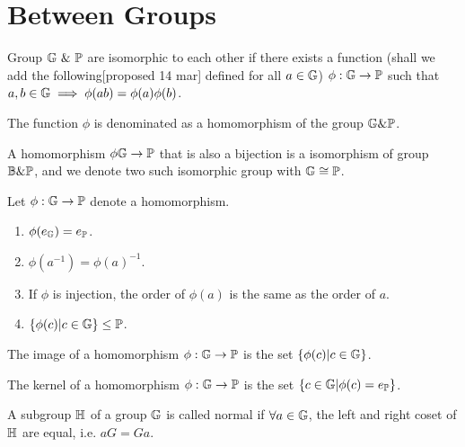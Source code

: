 \documentclass[../note.tex]{subfiles}
\begin{document}
\section{Between Groups}

\begin{definition}[Homomorphism]
	Group $\mathbb{G}\ \& \ \mathbb{P}$ are isomorphic to each other if there exists a function (shall we add the following[proposed 14 mar]  defined for all $a \in \mathbb{G}$)
	$\phi: \mathbb{G}\rightarrow \mathbb{P}$ such that	$ a, b \in \mathbb{G} \implies \phi(ab) = \phi(a)\phi(b)$.

	The function $\phi$ is denominated as a homomorphism of the group $\mathbb{G}\&\mathbb{P}$.
\end{definition}

\begin{definition}[Isomorphism]
	A homomorphism $\phi \mathbb{G} \rightarrow \mathbb{P}$ that is also a bijection is a isomorphism of group $\mathbb{B}\&\mathbb{P}$, and we denote two such isomorphic group with $\mathbb{G} \cong \mathbb{P}$.
\end{definition}

\begin{proposition}
	Let $\phi: \mathbb{G} \rightarrow \mathbb{P}$ denote a homomorphism. 
\begin{enumerate}
	\item $\phi(e_{\mathbb{G}}) = e_{\mathbb{P}}$. 
	\item $\phi(a^{-1}) = \phi(a)^{-1}$.
	\item If $\phi$ is injection, the order of $\phi(a)$ is the same as the order of $a$.
	\item $\{\phi(c) |c \in \mathbb{G}\}\leq \mathbb{P}$.
\end{enumerate}
\end{proposition}

\begin{definition}[Image]
	The image of a homomorphism $\phi: \mathbb{G} \rightarrow \mathbb{P}$ is the set $\{\phi(c) |c \in \mathbb{G}\}$.
\end{definition}
\begin{definition}[Kernel] 
	The kernel of a homomorphism $\phi: \mathbb{G} \rightarrow \mathbb{P}$ is the set $\{c \in \mathbb{G} | \phi(c) = e_{\mathbb{P}}\}$.
\end{definition}

\begin{definition}
	A subgroup $\mathbb{H}$ of a group $\mathbb{G}$ is called normal if $\forall a \in \mathbb{G}$, the left and right coset of $\mathbb{H}$ are equal, i.e. $aG=Ga$.
\end{definition}
\end{document}
